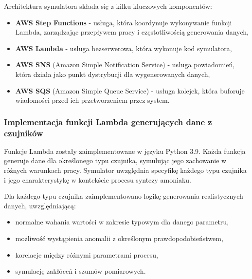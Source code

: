 Architektura symulatora składa się z kilku kluczowych komponentów:

\begin{itemize}
    \item \textbf{AWS Step Functions} - usługa, która koordynuje wykonywanie funkcji Lambda, zarządzając przepływem pracy i częstotliwością generowania danych,
    \item \textbf{AWS Lambda} \cite{aws_lambda_docs} - usługa bezserwerowa, która wykonuje kod symulatora,
    \item \textbf{AWS SNS} (Amazon Simple Notification Service) \cite{sns_docs} - usługa powiadomień, która działa jako punkt dystrybucji dla wygenerowanych danych,
    \item \textbf{AWS SQS} (Amazon Simple Queue Service) \cite{sqs_docs} - usługa kolejek, która buforuje wiadomości przed ich przetworzeniem przez system.
\end{itemize}

%

\subsubsection{Implementacja funkcji Lambda generujących dane z czujników}
\label{subsubsec:implementacja_lambda}

Funkcje Lambda zostały zaimplementowane w języku Python 3.9. Każda funkcja generuje dane dla określonego typu czujnika,
symulując jego zachowanie w różnych warunkach pracy. Symulator uwzględnia specyfikę każdego typu czujnika i jego charakterystykę w kontekście procesu syntezy amoniaku.

Dla każdego typu czujnika zaimplementowano logikę generowania realistycznych danych, uwzględniającą:
\begin{itemize}
    \item normalne wahania wartości w zakresie typowym dla danego parametru,
    \item możliwość wystąpienia anomalii z określonym prawdopodobieństwem,
    \item korelacje między różnymi parametrami procesu,
    \item symulację zakłóceń i szumów pomiarowych.
\end{itemize}